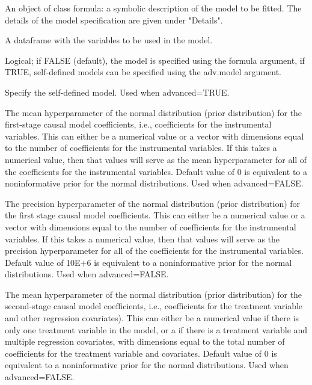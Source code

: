 \documentclass[a4paper]{book}
\begin{document}
\begin{Arguments}
\begin{ldescription}
\item[\code{formula}] An object of class formula: a symbolic description of the model to be fitted.
The details of the model specification are given under "Details".

\item[\code{data}] A dataframe with the variables to be used in the model.

\item[\code{advanced}] Logical; if FALSE (default), the model is specified using the formula argument,
if TRUE, self-defined models can be specified using the adv.model argument.

\item[\code{adv.model}] Specify the self-defined model. Used when advanced=TRUE.

\item[\code{b0}] The mean hyperparameter of the normal distribution (prior distribution)
for the first-stage causal model coefficients, i.e., coefficients for the instrumental variables.
This can either be a numerical value or a vector with dimensions equal to the number of coefficients
for the instrumental variables. If this takes a numerical value, then that values will
serve as the mean hyperparameter for all of the coefficients for the instrumental variables.
Default value of 0 is equivalent to a noninformative prior for the normal distributions.
Used when advanced=FALSE.

\item[\code{B0}] The precision hyperparameter of the normal distribution (prior distribution)
for the first stage causal model coefficients.
This can either be a numerical value or a vector with dimensions equal to the number of coefficients
for the instrumental variables. If this takes a numerical value, then that values will
serve as the precision hyperparameter for all of the coefficients for the instrumental variables.
Default value of 10E+6 is equivalent to a noninformative prior for the normal distributions.
Used when advanced=FALSE.

\item[\code{g0}] The mean hyperparameter of the normal distribution (prior distribution)
for the second-stage causal model coefficients,
i.e., coefficients for the treatment variable and other regression covariates).
This can either be a numerical value if there is only one treatment variable in the model,
or a if there is a treatment variable and multiple regression covariates,
with dimensions equal to the total number of coefficients for the treatment variable and covariates.
Default value of 0 is equivalent to a noninformative prior for the normal distributions.
Used when advanced=FALSE.


\end{ldescription}
\end{Arguments}
\end{document}
